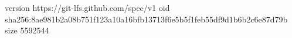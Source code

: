 version https://git-lfs.github.com/spec/v1
oid sha256:8ae981b2a08b751f123a10a16bfb13713f6e5b5f1feb55df9d1b6b2c6e87d79b
size 5592544
